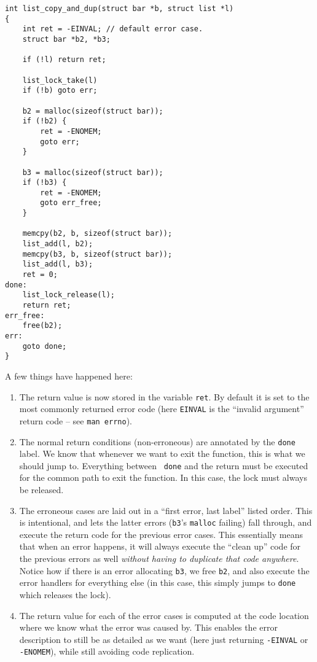 \documentclass[11pt,onecolumn]{article}
\begin{document}
    \begin{minipage}{3in}
      \footnotesize
      \lstset{language=C}
      \begin{lstlisting}
int list_copy_and_dup(struct bar *b, struct list *l)
{
    int ret = -EINVAL; // default error case.
    struct bar *b2, *b3;

    if (!l) return ret;

    list_lock_take(l)
    if (!b) goto err;

    b2 = malloc(sizeof(struct bar));
    if (!b2) {
        ret = -ENOMEM;
        goto err;
    }

    b3 = malloc(sizeof(struct bar));
    if (!b3) {
        ret = -ENOMEM;
        goto err_free;
    }

    memcpy(b2, b, sizeof(struct bar));
    list_add(l, b2);
    memcpy(b3, b, sizeof(struct bar));
    list_add(l, b3);
    ret = 0;
done:
    list_lock_release(l);
    return ret;
err_free:
    free(b2);
err:
    goto done;
}
      \end{lstlisting}
    \end{minipage}

A few things have happened here:
\begin{enumerate}[itemsep=0pt,topsep=1pt,parsep=1pt,leftmargin=2.5em]
\item The return value is now stored in the variable {\tt ret}.  By
  default it is set to the most commonly returned error code (here
  {\tt EINVAL} is the ``invalid argument'' return code -- see {\tt man
    errno}).
\item The normal return conditions (non-erroneous) are annotated by
  the {\tt done} label.  We know that whenever we want to exit the
  function, this is what we should jump to.  Everything between {\tt
    done} and the return must be executed for the common path to exit
  the function.  In this case, the lock must always be released.
\item The erroneous cases are laid out in a ``first error, last
  label'' listed order.  This is intentional, and lets the latter
  errors ({\tt b3}'s {\tt malloc} failing) fall through, and execute
  the return code for the previous error cases.  This essentially
  means that when an error happens, it will always execute the ``clean
  up'' code for the previous errors as well {\em without having to
    duplicate that code anywhere}.  Notice how if there is an error
  allocating {\tt b3}, we free {\tt b2}, and also execute the error
  handlers for everything else (in this case, this simply jumps to
  {\tt done} which releases the lock).
\item The return value for each of the error cases is computed at the
  code location where we know what the error was caused by.  This
  enables the error description to still be as detailed as we want
  (here just returning {\tt -EINVAL} or {\tt -ENOMEM}), while still
  avoiding code replication.
\end{enumerate}
\end{document}
